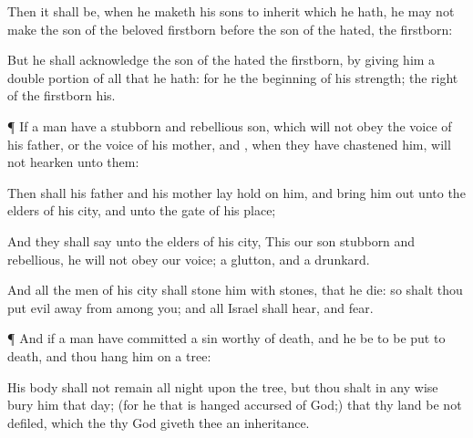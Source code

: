 {Then it shall be,
when he maketh his
sons to
inherit
{} which he hath,
{} he
may not make the
son of the
beloved
firstborn
before the
son of the
hated,
{} the
firstborn:

But he shall
acknowledge the
son of the
hated
{} the
firstborn, by
giving him a
double
portion of all that he
hath: for he
{} the
beginning of his
strength; the
right of the
firstborn
{} his.


\par }{\PP {}¶ If a
man have a
stubborn and
rebellious
son, which will not
obey the
voice of his
father, or the
voice of his
mother, and
{}, when they have
chastened him, will not
hearken unto them:

Then shall his
father and his
mother lay
hold on him, and bring him
out unto the
elders of his
city, and unto the
gate of his
place;

And they shall
say unto the
elders of his
city, This our
son
{}
stubborn and
rebellious, he will not
obey our
voice;
{} a
glutton, and a
drunkard.

And all the
men of his
city shall
stone him with
stones, that he
die: so shalt thou
put
evil
away from
among you; and all
Israel shall
hear, and
fear.


\par }{\PP {}¶ And if a
man have committed a
sin worthy
of
death, and he be to be put to
death, and thou
hang him on a
tree:

His
body shall not remain all
night upon the
tree, but thou shalt in any
wise
bury him that
day; (for he that is
hanged
{}
accursed of
God;) that thy
land be not
defiled, which the
{} thy
God
giveth thee
{} an
inheritance.




\par }
